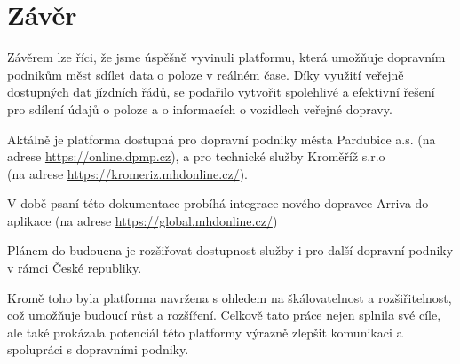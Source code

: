 \chapter{Závěr}
Závěrem lze říci, že jsme úspěšně vyvinuli platformu, která umožňuje dopravním podnikům měst sdílet data o poloze v reálném čase.
Díky využití veřejně dostupných dat jízdních řádů, se podařilo vytvořit spolehlivé a efektivní řešení pro sdílení údajů o poloze a o informacích o vozidlech veřejné dopravy.\par 
Aktálně je platforma dostupná pro dopravní podniky města Pardubice a.s. (na adrese \href{https://online.dpmp.cz}{https://online.dpmp.cz}), a pro technické služby Kroměříž s.r.o 
\\ (na adrese \href{https://kromeriz.mhdonline.cz/}{https://kromeriz.mhdonline.cz/}).

V době psaní této dokumentace probíhá integrace nového dopravce Arriva do aplikace (na adrese \href{https://global.mhdonline.cz/}{https://global.mhdonline.cz/})

Plánem do budoucna je rozšiřovat dostupnost služby i pro další dopravní podniky v rámci České republiky.\par 
Kromě toho byla platforma navržena s ohledem na škálovatelnost a rozšiřitelnost, což umožňuje budoucí růst a rozšíření. Celkově tato práce nejen splnila své cíle, ale také prokázala potenciál této platformy výrazně zlepšit komunikaci a spolupráci s dopravními podniky.
